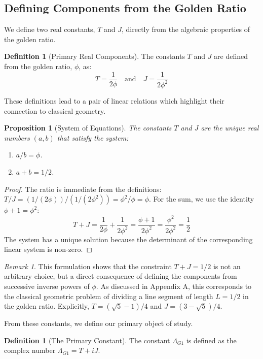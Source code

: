 \documentclass{amsart}
\theoremstyle{plain}
\newtheorem{proposition}[theorem]{Proposition}
\theoremstyle{definition}
\newtheorem{definition}[theorem]{Definition}
\theoremstyle{remark}
\newtheorem*{remark}{Remark}
\newcommand{\LambdaG}{\Lambda_{G1}}
\begin{document}
\subsection{Defining Components from the Golden Ratio}
We define two real constants, $T$ and $J$, directly from the algebraic properties of the golden ratio.

\begin{definition}[Primary Real Components]
The constants $T$ and $J$ are defined from the golden ratio, $\phi$, as:
$$ T = \frac{1}{2\phi} \quad \text{and} \quad J = \frac{1}{2\phi^2} $$
\end{definition}

These definitions lead to a pair of linear relations which highlight their connection to classical geometry.

\begin{proposition}[System of Equations]
The constants $T$ and $J$ are the unique real numbers $(a,b)$ that satisfy the system:
\begin{enumerate}
    \item $a/b = \phi$.
    \item $a+b = 1/2$.
\end{enumerate}
\end{proposition}
\begin{proof}
The ratio is immediate from the definitions: $T/J = (1/(2\phi))/(1/(2\phi^2)) = \phi^2/\phi = \phi$. For the sum, we use the identity $\phi+1 = \phi^2$:
$$ T+J = \frac{1}{2\phi} + \frac{1}{2\phi^2} = \frac{\phi+1}{2\phi^2} = \frac{\phi^2}{2\phi^2} = \frac{1}{2} $$
The system has a unique solution because the determinant of the corresponding linear system is non-zero.
\end{proof}

\begin{remark}
This formulation shows that the constraint $T+J=1/2$ is not an arbitrary choice, but a direct consequence of defining the components from successive inverse powers of $\phi$. As discussed in Appendix A, this corresponds to the classical geometric problem of dividing a line segment of length $L=1/2$ in the golden ratio. Explicitly, $T = (\sqrt{5}-1)/4$ and $J = (3-\sqrt{5})/4$.
\end{remark}

From these constants, we define our primary object of study.
\begin{definition}[The Primary Constant]
The constant $\LambdaG$ is defined as the complex number $\LambdaG = T+iJ$.
\end{definition}
\end{document}
